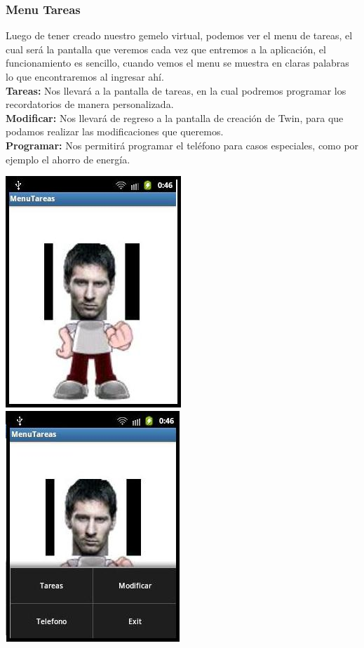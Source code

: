 \documentclass[12pt]{article}
\begin{document}
{{{\begin{flushleft}
\subsubsection{Menu Tareas}
\vspace{0.1in}
Luego de tener creado nuestro gemelo virtual, podemos ver el menu de tareas, el cual ser\'a la pantalla que veremos cada vez que entremos a la aplicaci\'on, el funcionamiento es sencillo, cuando vemos el menu se muestra en claras palabras lo que encontraremos al ingresar ah\'i.\\\vspace{0.2in}
\textbf{Tareas:} Nos llevar\'a a la pantalla de tareas, en la cual podremos programar los recordatorios de manera personalizada.\\\vspace{0.1in}
\textbf{Modificar:} Nos llevar\'a de regreso a la pantalla de creaci\'on de Twin, para que podamos realizar las modificaciones que queremos.\\\vspace{0.1in}
\textbf{Programar:} Nos permitir\'a programar el tel\'efono para casos especiales, como por ejemplo el ahorro de energ\'ia.\\

\begin{center}
\vspace{0.5in}
\includegraphics[scale=1.0]{imagenes_android/MenuTareas1.jpg}
\hspace{0.1in}\includegraphics[scale=1.0]{imagenes_android/MenuTareas2.jpg}
\end{center}


\end{flushleft}}}}
\end{document}
